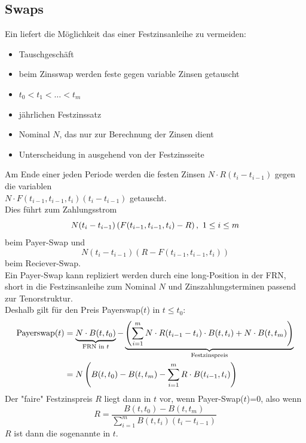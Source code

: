\subsection{Swaps}
\label{sub:swaps}
Ein  liefert die Möglichkeit das  einer Festzinsanleihe zu vermeiden:\\
\begin{itemize}
	\item Tauschgeschäft
	\item beim Zinsswap werden feste gegen variable Zinsen getauscht
	\item {} $t_0<t_1<\dots<t_m$
	\item jährlichen Festzinssatz
	\item Nominal $N$, das nur zur Berechnung der Zinsen dient
	\item Unterscheidung in   ausgehend von der Festzinsseite
\end{itemize}
Am Ende einer jeden Periode werden die festen Zinsen $N\cdot R(t_i-t_{i-1})$ gegen die variablen\\ $N\cdot F(t_{i-1},t_{i-1},t_i)(t_i-t_{i-1})$ getauscht.\\
Dies führt zum Zahlungsstrom
\[N(t_i-t_{i-1})\left( F(t_{i-1},t_{i-1},t_i)-R\right),~1\le i\le m \]
beim Payer-Swap und
\[N(t_i-t_{i-1})(R-F(t_{i-1},t_{i-1},t_i)) \]
beim Reciever-Swap.\\
Ein Payer-Swap kann repliziert werden durch eine long-Position in der FRN, short in die Festzinsanleihe zum Nominal $N$ und Zinszahlungsterminen passend zur Tenorstruktur.\\
Deshalb gilt für den Preis Payerswap($t$) in $t\le t_0$:\\
\begin{equation*}
\begin{aligned}
	\text{Payerswap}(t) &= \underbrace{N\cdot B(t,t_0)}_{\text{FRN in }t}-\underbrace{\left( \sum_{i=1}^{m}N\cdot R(t_{i-1}-t_i) \cdot B(t,t_i)+N\cdot B(t,t_m)\right)}_{\text{Festzinspreis}}\\
	&=N\left( B(t,t_0)-B(t,t_m)-\sum_{i=1}^{m}R\cdot B(t_{i-1},t_i)\right)
\end{aligned}
\end{equation*}
Der "faire" Festzinspreis $R$ liegt dann in $t$ vor, wenn Payer-Swap($t$)=0, also wenn
\[R= \frac{B(t,t_0)-B(t,t_m)}{\sum\limits_{i=1}^{m}B(t,t_i)(t_i-t_{i-1})} \]
$R$ ist dann die sogenannte  in $t$.

